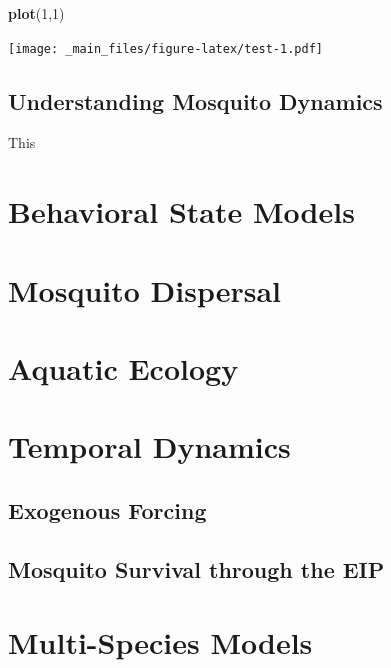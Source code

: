 \documentclass[
]{book}
\newenvironment{Shaded}{\begin{snugshade}}{\end{snugshade}}
\newcommand{\DecValTok}[1]{\textcolor[rgb]{0.00,0.00,0.81}{#1}}
\newcommand{\FunctionTok}[1]{\textcolor[rgb]{0.13,0.29,0.53}{\textbf{#1}}}
\newcommand{\NormalTok}[1]{#1}
\begin{document}
\begin{Shaded}
\begin{Highlighting}[]
\FunctionTok{plot}\NormalTok{(}\DecValTok{1}\NormalTok{,}\DecValTok{1}\NormalTok{)}
\end{Highlighting}
\end{Shaded}

\texttt{[image: \_main\_files/figure-latex/test-1.pdf]}

\section{Understanding Mosquito Dynamics}\label{understanding-mosquito-dynamics}

This

\chapter{Behavioral State Models}\label{behavioral-state-models}

\chapter{Mosquito Dispersal}\label{mosquito-dispersal}

\chapter{Aquatic Ecology}\label{aquatic-ecology}

\chapter{Temporal Dynamics}\label{temporal-dynamics}

\section{Exogenous Forcing}\label{exogenous-forcing-2}

\section{Mosquito Survival through the EIP}\label{mosquito-survival-through-the-eip}

\chapter{Multi-Species Models}\label{multi-species-models}
\end{document}
